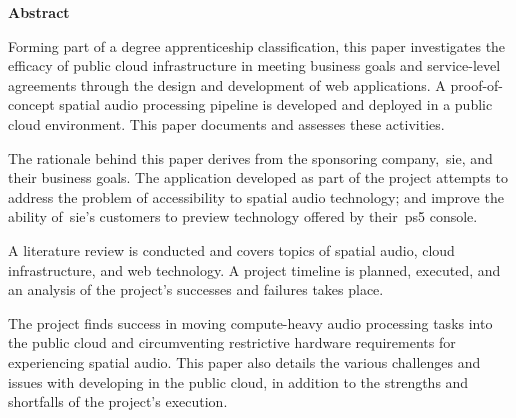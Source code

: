 \thispagestyle{plain}
\begin{center}
    \vspace{0.9cm}
    \textbf{Abstract}
\end{center}

Forming part of a degree apprenticeship classification, this paper investigates the efficacy of public cloud infrastructure in meeting business goals and service-level agreements through the design and development of web applications.
A proof-of-concept spatial audio processing pipeline is developed and deployed in a public cloud environment.
This paper documents and assesses these activities.

The rationale behind this paper derives from the sponsoring company,~\gls{sie}, and their business goals.
The application developed as part of the project attempts to address the problem of accessibility to spatial audio technology;
and improve the ability of~\gls{sie}'s customers to preview technology offered by their~\gls{ps5} console.

A literature review is conducted and covers topics of spatial audio, cloud infrastructure, and web technology.
A project timeline is planned, executed, and an analysis of the project's successes and failures takes place.

The project finds success in moving compute-heavy audio processing tasks into the public cloud and circumventing restrictive hardware requirements for experiencing spatial audio.
This paper also details the various challenges and issues with developing in the public cloud, in addition to the strengths and shortfalls of the project's execution.
